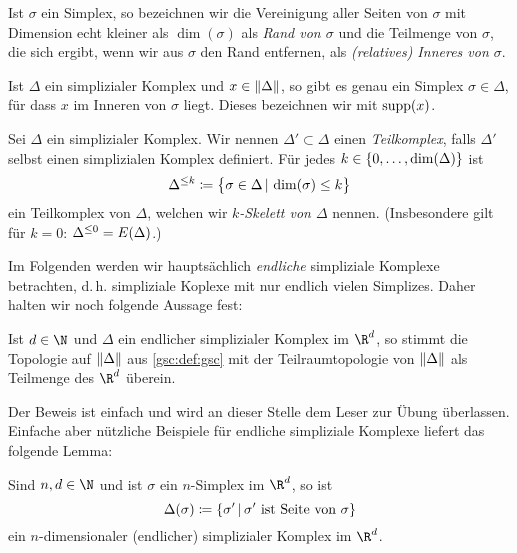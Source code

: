 \begin{thDef}
    Ist $\sigma$ ein Simplex, so bezeichnen wir die Vereinigung aller Seiten von
    $\sigma$ mit Dimension echt kleiner als $\dim(\sigma)$ als \emph{Rand von
    $\sigma$} und die Teilmenge von $\sigma$, die sich ergibt, wenn wir aus
    $\sigma$ den Rand entfernen, als \emph{(relatives) Inneres von $\sigma$}.
\end{thDef}

\begin{thDef}[Träger]
    Ist $\Delta$ ein simplizialer Komplex und $x\in\lVert\Delta\rVert$, so gibt es
    genau ein Simplex $\sigma\in\Delta$, für dass $x$ im Inneren von $\sigma$
    liegt. Dieses bezeichnen wir mit $\operatorname{supp}(x)$.
\end{thDef}

\begin{thDef}
    Sei $\Delta$ ein simplizialer Komplex. Wir nennen $\Delta'\subset\Delta$
    einen \emph{Teilkomplex}, falls $\Delta'$ selbst einen simplizialen Komplex
    definiert.
    Für jedes $k\in\{0,\ldots,\dim(\Delta)\}$ ist
    \[ \skeleton\Delta{k} 
        \defeq \bigl\{ \sigma\in\Delta \Mid \dim(\sigma)\leq k \bigr\}
    \]
    ein Teilkomplex von $\Delta$, welchen wir \emph{$k$-Skelett von $\Delta$}
    nennen. (Insbesondere gilt für $k=0$: $\Delta^{\leq0} = E(\Delta)$.)
\end{thDef}

\bigskip
Im Folgenden werden wir hauptsächlich \emph{endliche} simpliziale Komplexe
betrachten, d.\,h. simpliziale Koplexe mit nur endlich vielen Simplizes. Daher
halten wir noch folgende Aussage fest:

\begin{thLemma}
    Ist $d\in\N$ und $\Delta$ ein endlicher simplizialer Komplex im $\R^d$, 
    so stimmt die Topologie auf $\lVert\Delta\rVert$ aus \cref{gsc:def:gsc} mit 
    der Teilraumtopologie von $\lVert\Delta\rVert$ als Teilmenge des $\R^d$
    überein.
\end{thLemma}

Der Beweis ist einfach und wird an dieser Stelle dem Leser zur Übung überlassen.
Einfache aber nützliche Beispiele für endliche simpliziale Komplexe liefert das
folgende Lemma:

\begin{thLemma}
    \label{gsc:complexofsimplex}
    Sind $n,d\in\N$ und ist $\sigma$ ein $n$-Simplex im $\R^d$, so ist
    \[ \Delta(\sigma) 
        \defeq \{ \sigma' \Mid \sigma' \text{ ist Seite von } \sigma \}
    \]
    ein $n$-dimensionaler (endlicher) simplizialer Komplex im $\R^d$.
\end{thLemma}

